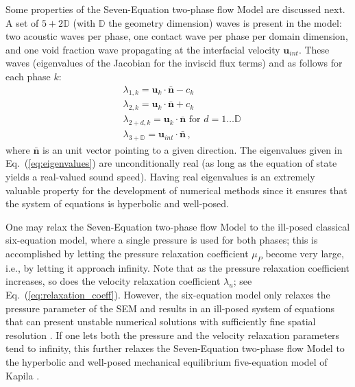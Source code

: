 \documentclass[preprint,10pt]{elsarticle}
\newcommand{\mbold}[1]{\boldsymbol#1}
\newcommand{\eqt}[1]{Eq.~(\ref{#1})}                     %
\begin{document}
Some properties of the Seven-Equation two-phase flow Model are discussed next. A set of $5+2\mathbb{D}$ (with $\mathbb{D}$ the geometry dimension) waves is present in the model: two acoustic waves per phase, one contact wave per phase per domain dimension, and one void fraction wave propagating at the interfacial velocity $\mbold u_{int}$. These waves (eigenvalues of the Jacobian for the inviscid flux terms) and as follows for each phase $k$:
% 
\begin{align}\label{eq:eigenvalues}
&\lambda_{1,k} = \mbold u_k \cdot \bar{\mbold n} - c_k \nonumber\\
&\lambda_{2,k} = \mbold u_k \cdot \bar{\mbold n} + c_k \nonumber\\
&\lambda_{2+d,k} = \mbold u_k \cdot \bar{\mbold n} \text{ for } d = 1 \dots \mathbb{D} \\
&\lambda_{3+\mathbb{D}} = \mbold u_{int} \cdot \bar{\mbold n} \nonumber \,,
\end{align}
%
where $\bar{\mbold n}$ is an unit vector pointing to a given direction. The eigenvalues given in \eqt{eq:eigenvalues} are unconditionally real (as long as the equation of state yields a real-valued sound speed). Having real eigenvalues is an extremely valuable property for the development of numerical methods since it ensures that the system of equations is hyperbolic and well-posed. 

One may relax the Seven-Equation two-phase flow Model to
the ill-posed classical six-equation model, where a single pressure 
is used for both phases; this is
accomplished by letting the pressure relaxation coefficient $\mu_P$ become
very large, i.e., by letting it approach infinity.  Note that as the pressure
relaxation coefficient increases, so does the velocity
relaxation coefficient $\lambda_u$; see \eqt{eq:relaxation_coeff}. 
However, the six-equation model only relaxes the pressure parameter of the SEM and results
in an ill-posed system of equations that can present unstable numerical solutions
with sufficiently fine spatial resolution \cite{SEM,Herrard_2005}. 
%
If one lets both the pressure and the velocity relaxation parameters tend to infinity, this further relaxes the
Seven-Equation two-phase flow Model to the hyperbolic and well-posed 
mechanical equilibrium five-equation model of Kapila \cite{Kapila_2001}.  
\end{document}
